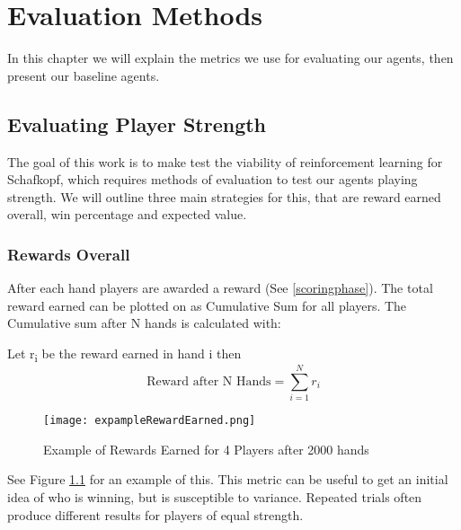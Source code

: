 \chapter{Evaluation Methods}
In this chapter we will explain the metrics we use for evaluating our agents, then present our baseline agents.


\section{Evaluating Player Strength}
The goal of this work is to make test the viability of reinforcement learning for Schafkopf, which requires methods
of evaluation to test our agents playing strength.
We will outline three main strategies for this, that are reward earned overall, win percentage and expected value.

\subsection{Rewards Overall}
After each hand players are awarded a reward (See \ref{scoringphase}).
The total reward earned can be plotted on as Cumulative Sum for all players.
The Cumulative sum after N hands is calculated with:
\newline
\begin{center}
    Let r\textsubscript{i} be the reward earned in hand i then
    \begin{equation}
        \text{Reward after N Hands} = \sum_{i=1}^{N} r_{i}
\end{equation}
\newline
\begin{figure}[h]
    \centering
    \texttt{[image: expampleRewardEarned.png]}
    \caption{Example of Rewards Earned for 4 Players after 2000 hands}
    \label{fig:exampleCumSum}
\end{figure}
\end{center}
See Figure \ref{fig:exampleCumSum} for an example of this.\newline
This metric can be useful to get an initial idea of who is winning, but is susceptible to variance.\newline
Repeated trials often produce different results for players of equal strength.

